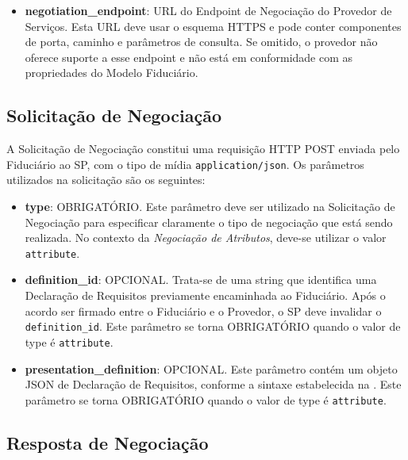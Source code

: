 \begin{itemize}
    \item \textbf{negotiation\_endpoint}: URL do Endpoint de Negociação do Provedor de Serviços. Esta URL deve usar o esquema HTTPS e pode conter componentes de porta, caminho e parâmetros de consulta. Se omitido, o provedor não oferece suporte a esse endpoint e não está em conformidade com as propriedades do Modelo Fiduciário.
\end{itemize}



\subsection{Solicitação de Negociação}\label{subsection:negotiation-request}

A Solicitação de Negociação constitui uma requisição HTTP POST enviada pelo Fiduciário ao \acs{SP}, com o tipo de mídia \texttt{application/json}. Os parâmetros utilizados na solicitação são os seguintes:



\begin{itemize}

    \item \textbf{type}: OBRIGATÓRIO. Este parâmetro deve ser utilizado na Solicitação de Negociação para especificar claramente o tipo de negociação que está sendo realizada. No contexto da \emph{Negociação de Atributos}, deve-se utilizar o valor \texttt{attribute}.

    \item \textbf{definition\_id}: OPCIONAL. Trata-se de uma string que identifica uma Declaração de Requisitos previamente encaminhada ao Fiduciário. Após o acordo ser firmado entre o Fiduciário e o Provedor, o \acs{SP} deve invalidar o \texttt{definition\_id}. Este parâmetro se torna OBRIGATÓRIO quando o valor de type é \texttt{attribute}.
    
    \item \textbf{presentation\_definition}: OPCIONAL. Este parâmetro contém um objeto JSON de Declaração de Requisitos, conforme a sintaxe estabelecida na \cite{presentation-exchange}. Este parâmetro se torna OBRIGATÓRIO quando o valor de type é \texttt{attribute}.
    
\end{itemize}

\subsection{Resposta de Negociação}


